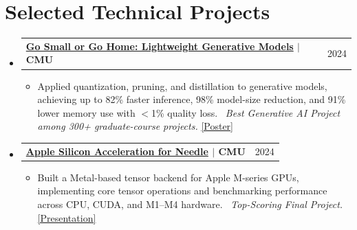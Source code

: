 \documentclass[letterpaper,10pt]{article}
\makeatletter
\newcommand{\resumeSubheadingTwo}[2]{
  \vspace{0pt}\item
    \begin{tabular*}{0.98\textwidth}[t]{l@{\extracolsep{\fill}}r}
      \textbf{#1} & {\small\color{dategray}#2} \\
    \end{tabular*}
    \vspace{-3pt}
}
\newcommand{\resumeSubHeadingListStart}{
  \begin{itemize}[
    leftmargin=0in,
    label={},
    itemsep=3pt,
    topsep=1pt,
    parsep=0pt
  ]
}
\newcommand{\resumeSubHeadingListEnd}{\end{itemize}\vspace{-4pt}}
\newcommand{\resumeItemListStart}{
  \begin{itemize}[
    leftmargin=0.15in,
    label=\raisebox{0.2ex}{\tiny$\bullet$},
    labelsep=0.4em,
    itemsep=1.5pt,
    parsep=0pt,
    topsep=2pt
  ]
}
\newcommand{\resumeItemListEnd}{\end{itemize}\vspace{-1pt}}
\newcommand{\resumelink}[2]{\href{#1}{\textcolor{accent}{#2}}}
\makeatother
\begin{document}
\section{Selected Technical Projects}

\resumeSubHeadingListStart

  \resumeSubheadingTwo
    {\resumelink{https://ema-ans.github.io/\#technical-detours}{Go Small or Go Home: Lightweight Generative Models} $|$ CMU}{2024}
  \resumeItemListStart
    \item Applied quantization, pruning, and distillation to generative models, achieving up to 82\% faster inference, 98\% model-size reduction, and 91\% lower memory use with $<$1\% quality loss. \textcolor{accent}{\faAward}~\textit{Best Generative AI Project among 300+ graduate-course projects.} \resumelink{https://ema-ans.github.io/assets/docs/go-small-or-go-home-poster.pdf}{[Poster]}
  \resumeItemListEnd

  \resumeSubheadingTwo
    {\resumelink{https://ema-ans.github.io/\#technical-detours}{Apple Silicon Acceleration for Needle} $|$ CMU}{2024}
  \resumeItemListStart
    \item Built a Metal-based tensor backend for Apple M-series GPUs, implementing core tensor operations and benchmarking performance across CPU, CUDA, and M1--M4 hardware. \textcolor{accent}{\faAward}~\textit{Top-Scoring Final Project.} \resumelink{https://youtu.be/MrolRcMDa90?si=pSbrbi2nPNr5Fig6}{[Presentation]}
  \resumeItemListEnd

\resumeSubHeadingListEnd
\end{document}
